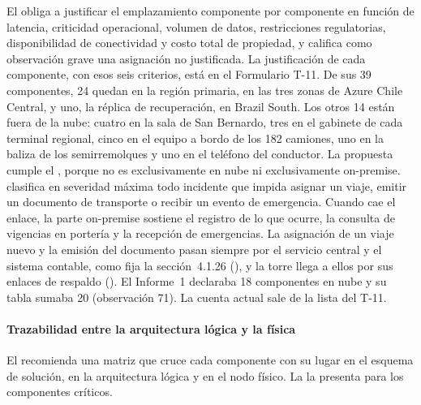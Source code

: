 El  obliga a justificar el emplazamiento componente por componente en función de
latencia, criticidad operacional, volumen de datos, restricciones regulatorias, disponibilidad de
conectividad y costo total de propiedad, y califica como observación grave una asignación no
justificada. La justificación de cada componente, con esos seis criterios, está en el Formulario T-11. De sus 39
componentes, 24 quedan en la región primaria, en las tres zonas de Azure Chile Central, y uno, la
réplica de recuperación, en Brazil South. Los otros 14 están fuera de la nube: cuatro en la sala de San
Bernardo, tres en el gabinete de cada terminal regional, cinco en el equipo a bordo de los 182 camiones,
uno en la baliza de los semirremolques y uno en el teléfono del conductor. La propuesta cumple el
, porque no es exclusivamente en nube ni exclusivamente on-premise. 
clasifica en severidad máxima todo incidente que impida asignar un viaje, emitir un documento de
transporte o recibir un evento de emergencia. Cuando cae el enlace, la parte on-premise sostiene el
registro de lo que ocurre, la consulta de vigencias en portería y la recepción de emergencias. La
asignación de un viaje nuevo y la emisión del documento pasan siempre por el servicio central y el
sistema contable, como fija la sección~4.1.26 (), y la torre llega a
ellos por sus enlaces de respaldo (). El Informe~1
declaraba 18 componentes en nube y su tabla sumaba 20 (observación 71). La cuenta actual sale de la
lista del T-11.

\paragraph{Trazabilidad entre la arquitectura lógica y la física} El 
recomienda una matriz que cruce cada componente con su lugar en el esquema de solución, en la
arquitectura lógica y en el nodo físico. La  la presenta para los componentes
críticos.

